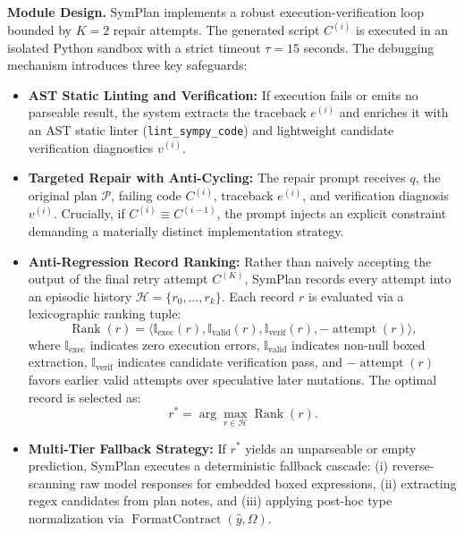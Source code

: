 \documentclass[conference,a4paper]{IEEEtran}
\begin{document}
\textbf{Module Design.} SymPlan implements a robust execution-verification loop bounded by $K=2$ repair attempts. The generated script $C^{(i)}$ is executed in an isolated Python sandbox with a strict timeout $\tau = 15$ seconds. The debugging mechanism introduces three key safeguards:
\begin{itemize}
    \item \textbf{AST Static Linting and Verification:} If execution fails or emits no parseable result, the system extracts the traceback $e^{(i)}$ and enriches it with an AST static linter (\texttt{lint\_sympy\_code}) and lightweight candidate verification diagnostics $v^{(i)}$.
    \item \textbf{Targeted Repair with Anti-Cycling:} The repair prompt receives $q$, the original plan $\mathcal{P}$, failing code $C^{(i)}$, traceback $e^{(i)}$, and verification diagnosis $v^{(i)}$. Crucially, if $C^{(i)} \equiv C^{(i-1)}$, the prompt injects an explicit constraint demanding a materially distinct implementation strategy.
    \item \textbf{Anti-Regression Record Ranking:} Rather than naively accepting the output of the final retry attempt $C^{(K)}$, SymPlan records every attempt into an episodic history $\mathcal{H} = \{r_0, \ldots, r_k\}$. Each record $r$ is evaluated via a lexicographic ranking tuple:
    \begin{equation}
    \operatorname{Rank}(r) = \langle \mathbb{I}_{\text{exec}}(r), \mathbb{I}_{\text{valid}}(r), \mathbb{I}_{\text{verif}}(r), -\operatorname{attempt}(r) \rangle,
    \end{equation}
    where $\mathbb{I}_{\text{exec}}$ indicates zero execution errors, $\mathbb{I}_{\text{valid}}$ indicates non-null boxed extraction, $\mathbb{I}_{\text{verif}}$ indicates candidate verification pass, and $-\operatorname{attempt}(r)$ favors earlier valid attempts over speculative later mutations. The optimal record is selected as:
    \begin{equation}
    r^* = \arg\max_{r \in \mathcal{H}} \operatorname{Rank}(r).
    \end{equation}
    \item \textbf{Multi-Tier Fallback Strategy:} If $r^*$ yields an unparseable or empty prediction, SymPlan executes a deterministic fallback cascade: (i) reverse-scanning raw model responses for embedded boxed expressions, (ii) extracting regex candidates from plan notes, and (iii) applying post-hoc type normalization via $\operatorname{FormatContract}(\hat{y}, \Omega)$.
\end{itemize}
\end{document}
